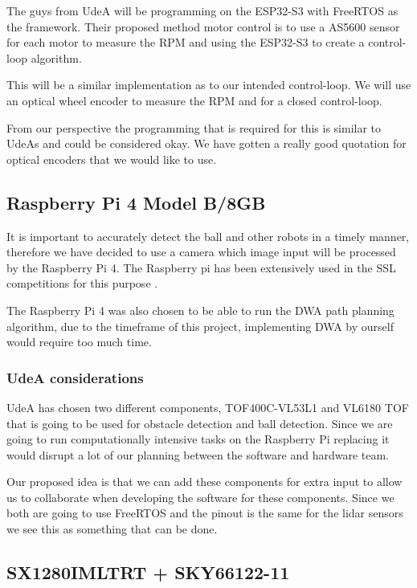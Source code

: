 \documentclass[a4paper,8pt]{article}
\begin{document}
  The guys from UdeA will be programming on the ESP32-S3 with FreeRTOS as the framework. Their proposed method motor control is to use a AS5600 sensor for each motor to measure the RPM and using the ESP32-S3 to create a control-loop algorithm.
  
  This will be a similar implementation as to our intended control-loop. We will use an optical wheel encoder to measure the RPM and for a closed control-loop.

  From our perspective the programming that is required for this is similar to UdeAs and could be considered okay. We have gotten a really good quotation for optical encoders that we would like to use.

  \subsection{Raspberry Pi 4 Model B/8GB}

  It is important to accurately detect the ball and other robots in a
  timely manner, therefore we have decided to use a camera which image
  input will be processed by the Raspberry Pi 4. The Raspberry pi has
  been extensively used in the SSL competitions for this purpose
  \cite{ommerExtendedTeamDescription}\cite{satoGreenTea2024Team}.

  The Raspberry Pi 4 was also chosen to be able to run the DWA path
  planning algorithm, due to the timeframe of this project, implementing
  DWA by ourself would require too much time.

  \subsubsection{UdeA considerations}

  UdeA has chosen two different components, TOF400C-VL53L1 and VL6180 TOF that is going to be used for obstacle detection and ball detection. Since we are going to run computationally intensive tasks on the Raspberry Pi replacing it would disrupt a lot of our planning between the software and hardware team.

  Our proposed idea is that we can add these components for extra input to allow us to collaborate when developing the software for these components. Since we both are going to use FreeRTOS and the pinout is the same for the lidar sensors we see this as something that can be done.

  \subsection{SX1280IMLTRT + SKY66122-11}
\end{document}
